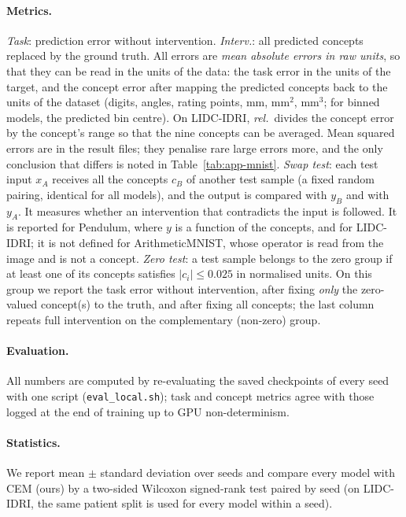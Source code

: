 \paragraph{Metrics.}
\emph{Task}: prediction error without intervention.
\emph{Interv.}: all predicted concepts replaced by the ground truth.
All errors are \emph{mean absolute errors in raw units}, so that they can be
read in the units of the data: the task error in the units of the target, and
the concept error after mapping the predicted concepts back to the units of the
dataset (digits, angles, rating points, mm, mm$^2$, mm$^3$; for binned models,
the predicted bin centre). On LIDC-IDRI, \emph{rel.}\ divides the concept error
by the concept's range so that the nine concepts can be averaged. Mean squared
errors are in the result files; they penalise rare large errors more, and the
only conclusion that differs is noted in Table~\ref{tab:app-mnist}.
\emph{Swap test}: each test input $x_A$ receives all the concepts $c_B$ of
another test sample (a fixed random pairing, identical for all models), and the
output is compared with $y_B$ and with $y_A$. It measures whether an
intervention that contradicts the input is followed. It is reported for
Pendulum, where $y$ is a function of the concepts, and for LIDC-IDRI; it is
not defined for ArithmeticMNIST, whose operator is read from the image and is
not a concept.
\emph{Zero test}: a test sample belongs to the zero group if at least one of
its concepts satisfies $|c_i| \le 0.025$ in normalised units. On this group we
report the task error without intervention, after fixing \emph{only} the
zero-valued concept(s) to the truth, and after fixing all concepts; the last
column repeats full intervention on the complementary (non-zero) group.

\paragraph{Evaluation.} All numbers are computed by re-evaluating the saved
checkpoints of every seed with one script (\texttt{eval\_local.sh}); task and
concept metrics agree with those logged at the end of training up to GPU
non-determinism.

\paragraph{Statistics.} We report mean $\pm$ standard deviation over seeds and
compare every model with CEM (ours) by a two-sided Wilcoxon signed-rank test
paired by seed (on LIDC-IDRI, the same patient split is used for every model
within a seed).

